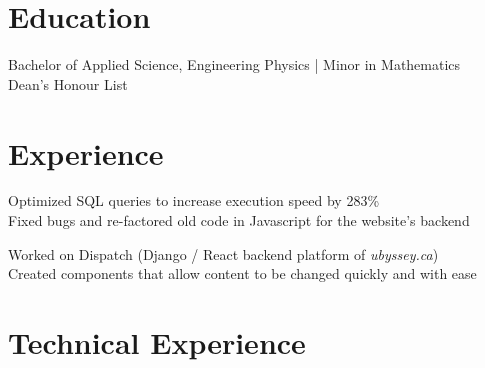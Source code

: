 \documentclass[]{deedy-resume-openfont}
\begin{document}
    
    
    
    
    
    \section{Education}
    Bachelor of Applied Science, Engineering Physics | Minor in Mathematics\\
    Dean's Honour List
    \sectionsep

    \section{Experience}
    
    
     Optimized SQL queries to increase execution speed by 283\%\\
     Fixed bugs and re-factored old code in Javascript for the website’s backend

    \sectionsep
    
    
     Worked on Dispatch (Django / React backend platform of \textit{ubyssey.ca})\\
     Created components that allow content to be changed quickly and with ease

    \sectionsep
    
    \section{Technical Experience}
    
    
\end{document}

